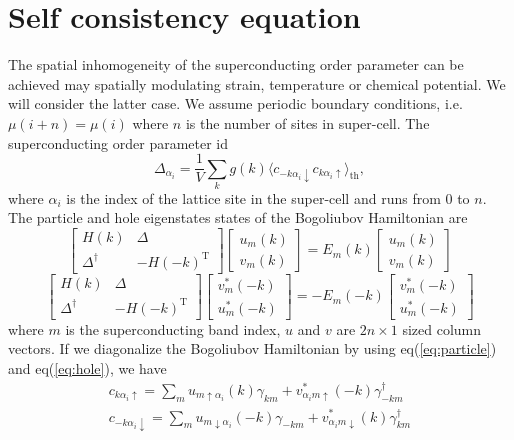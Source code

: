 \documentclass[%
 preprint,
 amsmath,amssymb,
 aps,
]{revtex4-1}
\begin{document}
\section{Self consistency equation}
The spatial inhomogeneity of the superconducting order parameter can be achieved may spatially modulating strain, temperature or chemical potential.  We will consider the latter case. We assume periodic boundary conditions, i.e. $\mu(i+n)=\mu(i)$ where $n$ is the number of sites in super-cell. The superconducting order parameter id
\begin{equation}
\Delta_{\alpha_i}=\frac{1}{V}\sum_{k}g(k)\langle c_{-k \alpha_i\downarrow}c_{k \alpha_i\uparrow}\rangle_\text{th},\label{eq:scdmu}
\end{equation}
where $\alpha_i$ is the index of the lattice site in the super-cell and runs from $0$ to $n$. The particle and hole eigenstates states of the Bogoliubov Hamiltonian are
\begin{equation}
\begin{bmatrix}
    H(k) & \Delta \\
    \Delta^{\dagger} & -H(-k)^{\text{T}} 
\end{bmatrix}
\begin{bmatrix}
    u_{m}(k)  \\
    v_{m}(k) 
\end{bmatrix}
=E_{m}(k) \begin{bmatrix}
    u_{m}(k)  \\
    v_{m}(k) 
\end{bmatrix}
\label{eq:particle}
\end{equation}
\begin{equation}
\begin{bmatrix}
    H(k) & \Delta \\
    \Delta^{\dagger} & -H(-k)^{\text{T}} 
\end{bmatrix}
\begin{bmatrix}
    v^{*}_{m}(-k)  \\
    u^{*}_{m}(-k) 
\end{bmatrix}
=-E_{m}(-k) \begin{bmatrix}
    v^{*}_{m}(-k)  \\
    u^{*}_{m}(-k) 
\end{bmatrix}
\label{eq:hole}
\end{equation}
where $m$ is the superconducting band index, $u$ and $v$ are $2n\times1$ sized column vectors.
If we diagonalize the Bogoliubov Hamiltonian by using eq(\ref{eq:particle}) and eq(\ref{eq:hole}), we have
\begin{align}
c_{ k \alpha_i\uparrow}=\sum_{m}u_{m\uparrow\alpha_i}(k)\gamma_{km}+v^{*}_{\alpha_i m\uparrow }(-k)\gamma^{\dagger}_{-km}\\c_{ -k \alpha_i\downarrow}=\sum_{m}u_{m\downarrow\alpha_i}(-k)\gamma_{-km}+v^{*}_{\alpha_i m\downarrow}(k)\gamma^{\dagger}_{km}
\end{align}
\end{document}
